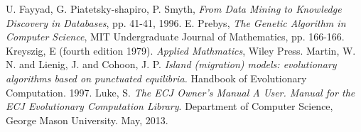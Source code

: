 \documentclass[conference]{IEEEtran}
\begin{document}
\begin{thebibliography}{1}
U. Fayyad, G. Piatetsky-shapiro, P. Smyth, \emph{From Data Mining to Knowledge Discovery in Databases}, pp. 41-41, 1996.
E. Prebys, \emph{The Genetic Algorithm in Computer Science}, MIT Undergraduate Journal of Mathematics, pp. 166-166.
Kreyszig, E (fourth edition 1979). \emph{Applied Mathmatics}, Wiley Press.
Martin, W. N. and Lienig, J. and Cohoon, J. P. \emph{Island (migration) models: evolutionary algorithms based on punctuated equilibria.} Handbook of Evolutionary Computation. 1997.
Luke, S. \emph{The ECJ Owner’s Manual A User. Manual for the ECJ Evolutionary Computation Library}. Department of Computer Science, George Mason University. May, 2013.
\end{thebibliography}

\end{document}
